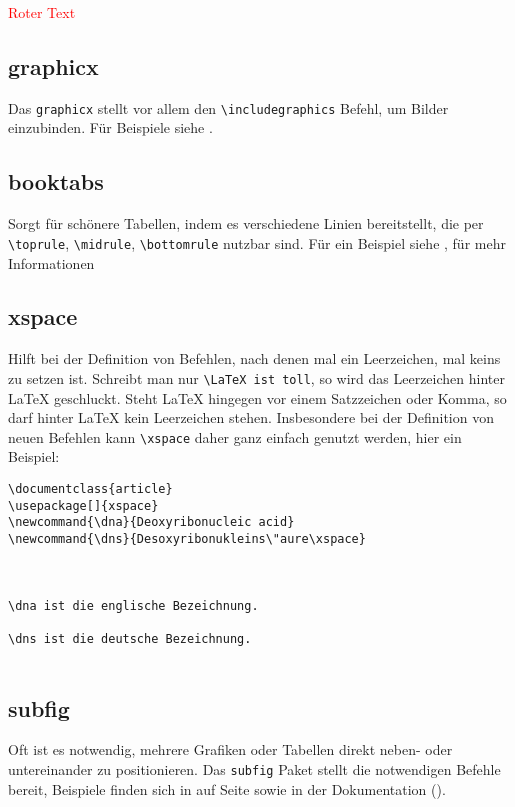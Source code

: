 \textcolor{red}{Roter Text}

\subsection{graphicx}

Das \texttt{graphicx} stellt vor allem den  \verb|\includegraphics| Befehl, um Bilder einzubinden. Für Beispiele siehe . 

\subsection{booktabs}

Sorgt für schönere Tabellen, indem es verschiedene Linien bereitstellt, die per \verb|\toprule|, \verb|\midrule|, \verb|\bottomrule| nutzbar sind. Für ein Beispiel siehe , für mehr Informationen \cite{booktabs}

\subsection{xspace}

Hilft bei der Definition von Befehlen, nach denen mal ein Leerzeichen, mal keins zu setzen ist. Schreibt man nur \verb|\LaTeX ist toll|, so wird das Leerzeichen hinter \LaTeX{} geschluckt. Steht \LaTeX{} hingegen vor einem Satzzeichen oder Komma, so darf hinter \LaTeX{} kein Leerzeichen stehen. Insbesondere bei der Definition von neuen Befehlen kann \verb|\xspace| daher ganz einfach genutzt werden, hier ein Beispiel:

\begin{lstlisting}
\documentclass{article}
\usepackage[]{xspace}
\newcommand{\dna}{Deoxyribonucleic acid}
\newcommand{\dns}{Desoxyribonukleins\"aure\xspace}



\dna ist die englische Bezeichnung.

\dns ist die deutsche Bezeichnung.


\end{lstlisting}

\subsection{subfig}

Oft ist es notwendig, mehrere Grafiken oder Tabellen direkt neben- oder untereinander zu positionieren. Das \texttt{subfig} Paket stellt die notwendigen Befehle bereit, Beispiele finden sich in  auf Seite \pageref{sec:figures} sowie in der Dokumentation (\cite{subfig}).

